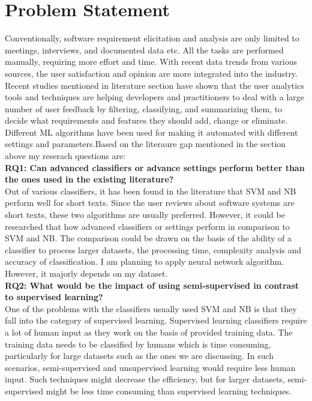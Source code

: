 \section{Problem Statement}
Conventionally, software requirement elicitation and analysis are only limited to meetings,
interviews, and documented data etc. All the tasks are performed manually, requiring more
effort and time. With recent data trends from various sources, the user satisfaction and opinion
are more integrated into the industry. Recent studies mentioned in literature section have shown that the user analytics tools
and techniques are helping developers and practitioners to deal with a large number of user
feedback by filtering, classifying, and summarizing them, to decide what requirements and
features they should add, change or eliminate. Different ML algorithms have been used for
making it automated with different settings and parameters.Based on the literaure gap mentioned in the section above my reserach questions are:\\


\textbf{RQ1: Can advanced classifiers or advance settings perform better than the ones used in the existing
literature?}\\
Out of various classifiers, it has been found in the literature that SVM and NB perform well for
short texts. Since the user reviews about software systems are short texts, these two algorithms
are usually preferred. However, it could be researched that how advanced classifiers or settings perform
in comparison to SVM and NB. The comparison could be drawn on the basis of the ability of a
classifier to process larger datasets, the processing time, complexity analysis and accuracy of
classification. I am planning to apply neural network algorithm. However, it majorly depends on my dataset.\\

\textbf{RQ2: What would be the impact of using semi-supervised in
contrast to supervised learning?}\\
One of the problems with the classifiers usually used SVM and NB is that they fall into the
category of supervised learning. Supervised learning classifiers require a lot of human input as
they work on the basis of provided training data. The training data needs to be classified by
humans which is time consuming, particularly for large datasets such as the ones we are
discussing. In such scenarios, semi-supervised and unsupervised learning would require
less human input. Such techniques might decrease the efficiency, but for larger datasets, semi-supervised
might be less time consuming than supervised learning
techniques.\\

